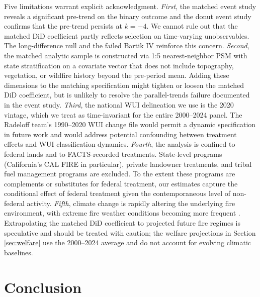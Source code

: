 \documentclass[12pt, letterpaper]{article}
\begin{document}
Five limitations warrant explicit acknowledgment. \textit{First}, the matched event study reveals a significant pre-trend on the binary outcome and the donut event study confirms that the pre-trend persists at $k = -4$. We cannot rule out that the matched DiD coefficient partly reflects selection on time-varying unobservables. The long-difference null and the failed Bartik IV reinforce this concern. \textit{Second}, the matched analytic sample is constructed via 1:5 nearest-neighbor PSM with state stratification on a covariate vector that does not include topography, vegetation, or wildfire history beyond the pre-period mean. Adding these dimensions to the matching specification might tighten or loosen the matched DiD coefficient, but is unlikely to resolve the parallel-trends failure documented in the event study. \textit{Third}, the national WUI delineation we use is the 2020 vintage, which we treat as time-invariant for the entire 2000--2024 panel. The Radeloff team's 1990--2020 WUI change file would permit a dynamic specification in future work and would address potential confounding between treatment effects and WUI classification dynamics. \textit{Fourth}, the analysis is confined to federal lands and to FACTS-recorded treatments. State-level programs (California's CAL FIRE in particular), private landowner treatments, and tribal fuel management programs are excluded. To the extent these programs are complements or substitutes for federal treatment, our estimates capture the conditional effect of federal treatment given the contemporaneous level of non-federal activity. \textit{Fifth}, climate change is rapidly altering the underlying fire environment, with extreme fire weather conditions becoming more frequent \citep{brown2023}. Extrapolating the matched DiD coefficient to projected future fire regimes is speculative and should be treated with caution; the welfare projections in Section \ref{sec:welfare} use the 2000--2024 average and do not account for evolving climatic baselines.


\section{Conclusion}\label{sec:conclusion}
\end{document}
